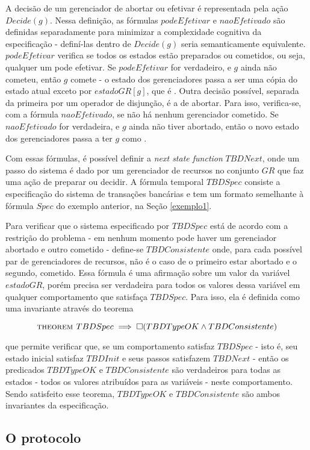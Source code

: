 A decisão de um gerenciador de abortar ou efetivar é representada pela ação
$Decide(g)$. Nessa definição, as fórmulas $podeEfetivar$ e $naoEfetivado$ são
definidas separadamente para minimizar a complexidade cognitiva da especificação
- definí-las dentro de $Decide(g)$ seria semanticamente equivalente.
$podeEfetivar$ verifica se todos os estados estão preparados ou cometidos, ou seja, qualquer um pode efetivar. Se $podeEfetivar$ for verdadeiro, e $g$ ainda não cometeu, então $g$ comete - o estado dos gerenciadores passa a ser uma cópia do estado atual exceto por $estadoGR[g]$, que é \cometido. Outra decisão possível, separada da primeira por um operador de disjunção, é a de abortar. Para isso, verifica-se, com a fórmula $naoEfetivado$, se não há nenhum gerenciador cometido. Se $naoEfetivado$ for verdadeira, e $g$ ainda não tiver abortado, então o novo estado dos gerenciadores passa a ter $g$ como \abortado.

Com essas fórmulas, é possível definir a \textit{next state function} $TBDNext$, onde um passo do sistema é dado por um gerenciador de recursos no conjunto $GR$ que faz uma ação de preparar ou decidir. A fórmula temporal $TBDSpec$ consiste a especificação do sistema de transações bancárias e tem um formato semelhante à fórmula $Spec$ do exemplo anterior, na Seção \ref{exemplo1}.

Para verificar que o sistema especificado por $TBDSpec$ está de acordo com a restrição do problema - em nenhum momento pode haver um gerenciador abortado e outro cometido - define-se $TBDConsistente$ onde, para cada possível par de gerenciadores de recursos, não é o caso de o primeiro estar abortado e o segundo, cometido. Essa fórmula é uma afirmação sobre um valor da variável $estadoGR$, porém precisa ser verdadeira para todos os valores dessa variável em qualquer comportamento que satisfaça $TBDSpec$. Para isso, ela é definida como uma invariante através do teorema

\[\textsc{theorem } TBDSpec \implies \square(TBDTypeOK \land TBDConsistente)\]

que permite verificar que, se um comportamento satisfaz $TBDSpec$ - isto é, seu
estado inicial satisfaz $TBDInit$ e seus passos satisfazem $TBDNext$ - então os
predicados $TBDTypeOK$ e $TBDConsistente$ são verdadeiros para todas as estados
- todos os valores atribuídos para as variáveis - neste comportamento. Sendo
satisfeito esse teorema, $TBDTypeOK$ e $TBDConsistente$ são ambos invariantes da especificação.

\subsection{O protocolo}

